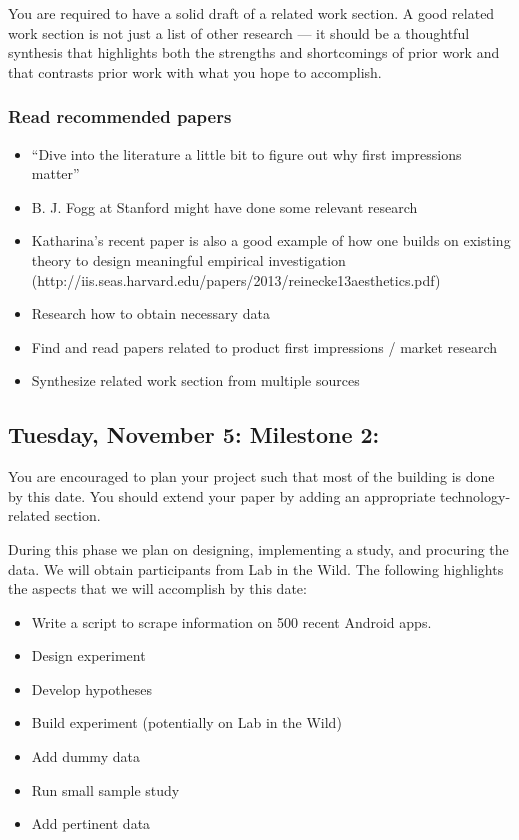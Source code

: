 \documentclass{article}
\begin{document}
You are required to have a solid draft of a related work section. A good related work section is not just a list of other research --- it should be a thoughtful synthesis that highlights both the strengths and shortcomings of prior work and that contrasts prior work with what you hope to accomplish. \\

\subsubsection{Read recommended papers}
\begin{itemize}
\item “Dive into the literature a little bit to figure out why first impressions matter”
\item B. J. Fogg at Stanford might have done some relevant research
\item Katharina's recent paper is also a good example of how one builds on existing theory to design meaningful empirical investigation (http://iis.seas.harvard.edu/papers/2013/reinecke13aesthetics.pdf)
\item Research how to obtain necessary data
\item Find and read papers related to product first impressions / market research
\item Synthesize related work section from multiple sources
\end{itemize}

\subsection{Tuesday, November 5: Milestone 2:}

You are encouraged to plan your project such that most of the building is done by this date. You should extend your paper by adding an appropriate
technology-related section.

During this phase we plan on designing,  implementing a study, and procuring the data. We will obtain participants from Lab in the Wild. The following highlights the aspects that we will accomplish by this date:

\begin{itemize}
\item Write a script to scrape information on 500 recent Android apps.
\item Design experiment
\item Develop hypotheses
\item Build experiment (potentially on Lab in the Wild)
\item Add dummy data
\item Run small sample study
\item Add pertinent data
\end{itemize}
\end{document}
